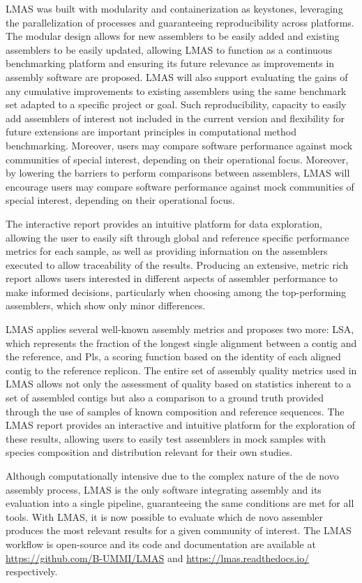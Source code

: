 LMAS was built with modularity and containerization as keystones, leveraging the parallelization of processes and guaranteeing reproducibility across platforms. The modular design allows for new assemblers to be easily added and existing assemblers to be easily updated, allowing LMAS to function as a continuous benchmarking platform and ensuring its future relevance as improvements in assembly software are proposed. LMAS will also support evaluating the gains of any cumulative improvements to existing assemblers  using the same benchmark set adapted to a specific project or goal. Such reproducibility, capacity to easily add assemblers of interest not included in the current version and flexibility for future extensions are important principles in computational method benchmarking. Moreover, users may compare software performance against mock communities of special interest, depending on their operational focus. Moreover, by lowering the barriers to perform comparisons between assemblers, LMAS will encourage users may compare software performance against mock communities of special interest, depending on their operational focus.

The interactive report provides an intuitive platform for data exploration, allowing the user to easily sift through global and reference specific performance metrics for each sample, as well as providing information on the assemblers executed to allow traceability of the results. Producing an extensive, metric rich report allows users interested in different aspects of assembler performance to make informed decisions, particularly when choosing among the top-performing assemblers, which show only minor differences.

LMAS applies several well-known assembly metrics and proposes two more: \ac{LSA}, which represents the fraction of the longest single alignment between a contig and the reference, and \ac{Pls}, a scoring function based on the identity of each aligned contig to the reference replicon. The entire set of assembly quality metrics used in LMAS allows not only the assessment of quality based on statistics inherent to a set of assembled contigs but also a comparison to a ground truth provided through the use of samples of known composition and reference sequences. The LMAS report provides an interactive and intuitive platform for the exploration of these results, allowing users to easily test assemblers in mock samples with species composition and distribution relevant for their own studies.

Although computationally intensive due to the complex nature of the de novo assembly process, LMAS is the only software integrating assembly and its evaluation into a single pipeline, guaranteeing the same conditions are met for all tools. With LMAS, it is now possible to evaluate which de novo assembler produces the most relevant results for a given community of interest. The LMAS workflow is open-source and its code and documentation are available at \url{https://github.com/B-UMMI/LMAS} and \url{https://lmas.readthedocs.io/} respectively.

